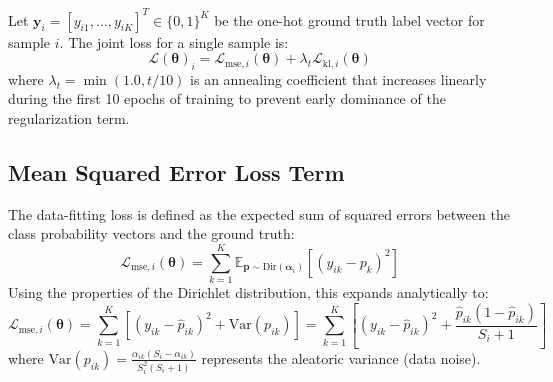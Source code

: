 \documentclass[11pt,journal,onecolumn]{IEEEtran}
\begin{document}
Let $\mathbf{y}_i = [y_{i1}, \dots, y_{iK}]^T \in \{0, 1\}^K$ be the one-hot ground truth label vector for sample $i$. The joint loss for a single sample is:
\begin{equation}
    \mathcal{L}(\boldsymbol{\theta})_i = \mathcal{L}_{\text{mse}, i}(\boldsymbol{\theta}) + \lambda_t \mathcal{L}_{\text{kl}, i}(\boldsymbol{\theta})
\end{equation}
where $\lambda_t = \min(1.0, t / 10)$ is an annealing coefficient that increases linearly during the first 10 epochs of training to prevent early dominance of the regularization term.

\subsection{Mean Squared Error Loss Term}
The data-fitting loss is defined as the expected sum of squared errors between the class probability vectors and the ground truth:
\begin{equation}
    \mathcal{L}_{\text{mse}, i}(\boldsymbol{\theta}) = \sum_{k=1}^K \mathbb{E}_{\mathbf{p} \sim \text{Dir}(\boldsymbol{\alpha}_i)} \left[ (y_{ik} - p_k)^2 \right]
\end{equation}
Using the properties of the Dirichlet distribution, this expands analytically to:
\begin{equation}
    \mathcal{L}_{\text{mse}, i}(\boldsymbol{\theta}) = \sum_{k=1}^K \left[ (y_{ik} - \hat{p}_{ik})^2 + \text{Var}(p_{ik}) \right] = \sum_{k=1}^K \left[ (y_{ik} - \hat{p}_{ik})^2 + \frac{\hat{p}_{ik} (1 - \hat{p}_{ik})}{S_i + 1} \right]
\end{equation}
where $\text{Var}(p_{ik}) = \frac{\alpha_{ik}(S_i - \alpha_{ik})}{S_i^2(S_i + 1)}$ represents the aleatoric variance (data noise).
\end{document}
